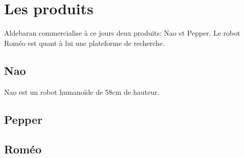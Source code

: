 \section{Les produits}
\label{Entreprise: Les produits}
Aldebaran commercialise à ce jours deux produits: Nao et Pepper. Le robot Roméo est quant à lui une plateforme de recherche. 

\subsection{Nao}
\label{Entreprise: Les produits: Nao}
Nao est un robot humanoïde de 58cm de hauteur. 


\subsection{Pepper}
\label{Entreprise: Les produits: Pepper}

\subsection{Roméo}
\label{Entreprise: Les produits: Roméo}

